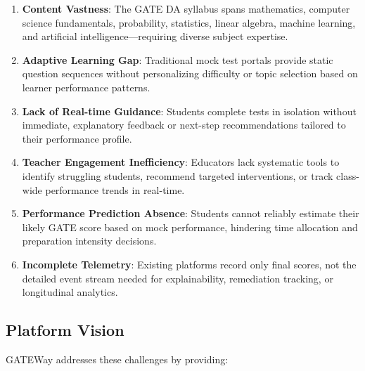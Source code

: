 \documentclass[sigconf,authordraft,twoside]{acmart}
\newcommand{\project}{GATEWay}
\begin{document}
\begin{enumerate}
\item \textbf{Content Vastness}: The GATE DA syllabus spans mathematics, computer science fundamentals, probability, statistics, linear algebra, machine learning, and artificial intelligence---requiring diverse subject expertise.

\item \textbf{Adaptive Learning Gap}: Traditional mock test portals provide static question sequences without personalizing difficulty or topic selection based on learner performance patterns.

\item \textbf{Lack of Real-time Guidance}: Students complete tests in isolation without immediate, explanatory feedback or next-step recommendations tailored to their performance profile.

\item \textbf{Teacher Engagement Inefficiency}: Educators lack systematic tools to identify struggling students, recommend targeted interventions, or track class-wide performance trends in real-time.

\item \textbf{Performance Prediction Absence}: Students cannot reliably estimate their likely GATE score based on mock performance, hindering time allocation and preparation intensity decisions.

\item \textbf{Incomplete Telemetry}: Existing platforms record only final scores, not the detailed event stream needed for explainability, remediation tracking, or longitudinal analytics.
\end{enumerate}

\subsection{Platform Vision}
\project{} addresses these challenges by providing:
\end{document}
